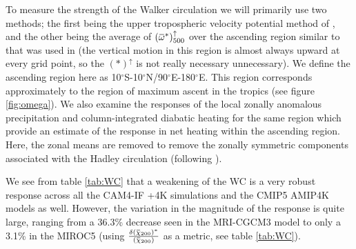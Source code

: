\documentclass[letterpaper,12pt,titlepage,oneside,final]{book}
\newcommand{\overbar}[1]{\mkern 1.5mu\overline{\mkern-1.5mu#1\mkern-1.5mu}\mkern 1.5mu}
\begin{document}
To measure the strength of the Walker circulation we will primarily use two methods; the first being the upper tropospheric velocity potential method of \citep{tanaka_trend_2004}, and the other being the average of $(\overbar{\omega}^{*})_{500}^{\uparrow}$ over the ascending region similar to that was used in \citep{wills_local_2017} (the vertical motion in this region is almost always upward at every grid point, so the $(*)^{\uparrow}$ is not really necessary unnecessary). We define the ascending region here as 10$^{\circ}$S-10$^{\circ}$N/90$^{\circ}$E-180$^{\circ}$E. This region corresponds approximately to the region of maximum ascent in the tropics (see figure \ref{fig:omega}). We also examine the responses of the local zonally anomalous precipitation and column-integrated diabatic heating for the same region which provide an estimate of the response in net heating within the ascending region. Here, the zonal means are removed to remove the zonally symmetric components associated with the Hadley circulation (following \cite{wills_local_2017}).

We see from table \ref{tab:WC} that a weakening of the WC is a very robust response across all the CAM4-IF +4K simulations and the CMIP5 AMIP4K models as well. However, the variation in the magnitude of the response is quite large, ranging from a 36.3\% decrease seen in the MRI-CGCM3 model to only a 3.1\% in the MIROC5 (using $\frac{\delta(\overbar{\chi}_{200})^{*}}{(\overbar{\chi}_{200})}$ as a metric, see table \ref{tab:WC}).
\end{document}
